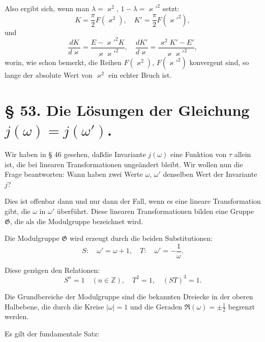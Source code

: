 \documentclass[12pt,a4paper]{article}
\theoremstyle{definition}
\begin{document}
Also ergibt sich, wenn man $\lambda = \varkappa^2$, $1 - \lambda = \varkappa'^2$ setzt:
\begin{equation}\tag{16}
K = \frac{\pi}{2}F(\varkappa^2), \quad K' = \frac{\pi}{2}F(\varkappa'^2),
\end{equation}
und
\begin{equation}\tag{17}
\frac{dK}{d\varkappa} = \frac{E - \varkappa'^2K}{\varkappa\varkappa'^2}, \quad
\frac{dK'}{d\varkappa} = \frac{\varkappa^2K' - E'}{\varkappa\varkappa'^2},
\end{equation}
worin, wie schon bemerkt, die Reihen $F(\varkappa^2)$, $F(\varkappa'^2)$ konvergent
sind, so lange der absolute Wert von $\varkappa^2$ ein echter
Bruch ist.

\section*{\S{} 53. Die L\"{o}sungen der Gleichung $j(\omega) = j(\omega')$.}

Wir haben in \S{} 46 gesehen, da\ss die Invariante $j(\omega)$ eine
Funktion von $\tau$ allein ist, die bei linearen Transformationen
unge\"{a}ndert bleibt. Wir wollen nun die Frage beantworten: Wann
haben zwei Werte $\omega$, $\omega'$ denselben Wert der Invariante $j$?

Dies ist offenbar dann und nur dann der Fall, wenn es eine
lineare Transformation gibt, die $\omega$ in $\omega'$ \"{u}berf\"{u}hrt. Diese
linearen Transformationen bilden eine Gruppe $\mathfrak{G}$, die als die
Modulgruppe bezeichnet wird.

Die Modulgruppe $\mathfrak{G}$ wird erzeugt durch die beiden Substitutionen:
\begin{equation}\tag{1}
S: \quad \omega' = \omega + 1, \quad T: \quad \omega' = -\frac{1}{\omega}.
\end{equation}

Diese gen\"{u}gen den Relationen:
\begin{equation}\tag{2}
S^n = 1 \quad (n \in \mathbb{Z}), \quad T^2 = 1, \quad (ST)^3 = 1.
\end{equation}

Die Grundbereiche der Modulgruppe sind die bekannten
Dreiecke in der oberen Halbebene, die durch die Kreise
$|\omega| = 1$ und die Geraden $\Re(\omega) = \pm\frac{1}{2}$ begrenzt werden.

Es gilt der fundamentale Satz:
\end{document}
